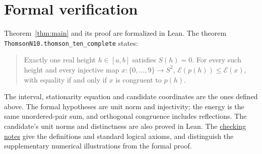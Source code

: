 \documentclass[11pt]{article}
\newcommand{\E}{\mathcal{E}}
\begin{document}
\section{Formal verification}\label{sec:verification}
Theorem~\ref{thm:main} and its proof are formalized in Lean. The theorem
\nolinkurl{ThomsonN10.thomson_ten_complete} states:
\begin{quote}
Exactly one real height $h\in[a,b]$ satisfies $S(h)=0$. For every such
height and every injective map $x:\{0,\ldots,9\}\to S^2$,
$\E(p(h))\leq\E(x)$, with equality if and only if $x$ is congruent to $p(h)$.
\end{quote}
The interval, stationarity equation and candidate coordinates are the
ones defined above. The formal hypotheses are unit
norm and injectivity; the energy is the same unordered-pair sum, and
orthogonal congruence includes reflections. The candidate's unit norms
and distinctness are also proved in Lean. The
\href{https://github.com/6/clank-lab/blob/thomson-10-v6/results/thomson-10/checks/README.md}{checking notes}
give the definitions and standard logical axioms, and distinguish the
supplementary numerical illustrations from the formal proof.
\end{document}
